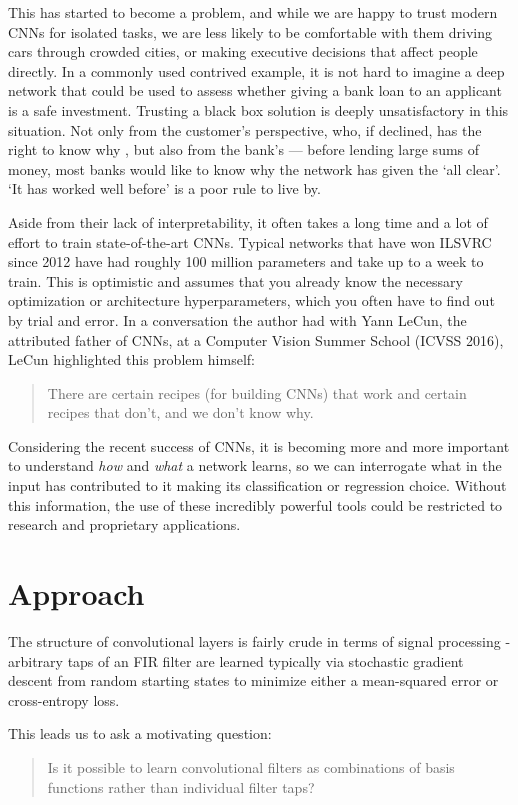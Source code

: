 This has started to become a problem, and while we are happy to trust modern
CNNs for isolated tasks, we are less likely to be comfortable with them driving
cars through crowded cities, or making executive decisions that affect people
directly. In a commonly used contrived example, it is not hard to imagine a deep
network that could be used to assess whether giving a bank loan to an applicant
is a safe investment. Trusting a black box solution is deeply unsatisfactory in
this situation. Not only from the customer's perspective, who, if declined, has
the right to know why \cite{goodman_european_2017-1}, but
also from the bank's --- before lending large sums of money, most banks
would like to know why the network has given the `all clear'. `It has worked well
before' is a poor rule to live by.

Aside from their lack of interpretability, it often takes a long time and a lot of
effort to train state-of-the-art CNNs. Typical networks that have won ILSVRC
since 2012 have had roughly 100 million parameters and take up to a week to train. This
is optimistic and assumes that you already know the necessary optimization or
architecture hyperparameters, which you often have to find out by trial and error.
In a conversation the author had with Yann LeCun, the attributed father of
CNNs, at a Computer Vision Summer School (ICVSS 2016), LeCun highlighted this problem
himself:
\begin{quote}
  There are certain recipes (for building CNNs) that work and certain recipes
  that don't, and we don't know why.
\end{quote}

Considering the recent success of CNNs, it is becoming more and more
important to understand \emph{how} and \emph{what} a network learns, so we can
interrogate what in the input has contributed to it making its classification or regression choice.
Without this information, the use of these incredibly powerful tools could be
restricted to research and proprietary applications.

\section{Approach}
The structure of convolutional layers is fairly crude in terms of signal
processing - arbitrary taps of an FIR filter are learned typically via
stochastic gradient descent from random starting states to minimize either a
mean-squared error or cross-entropy loss.

This leads us to ask a motivating question:
%
\begin{quote}
  Is it possible to learn convolutional filters as combinations of basis
  functions rather than individual filter taps?
\end{quote}

